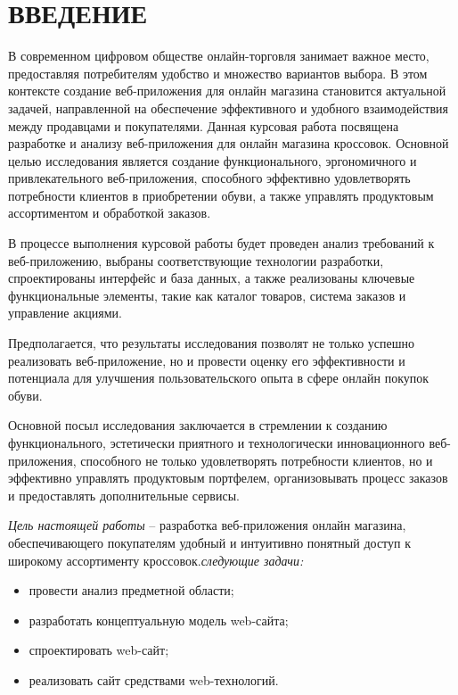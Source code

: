 \section*{ВВЕДЕНИЕ}

В современном цифровом обществе онлайн-торговля занимает важное место, предоставляя потребителям удобство и множество вариантов выбора. В этом контексте создание веб-приложения для онлайн магазина становится актуальной задачей, направленной на обеспечение эффективного и удобного взаимодействия между продавцами и покупателями. Данная курсовая работа посвящена разработке и анализу веб-приложения для онлайн магазина кроссовок. Основной целью исследования является создание функционального, эргономичного и привлекательного веб-приложения, способного эффективно удовлетворять потребности клиентов в приобретении обуви, а также управлять продуктовым ассортиментом и обработкой заказов.

В процессе выполнения курсовой работы будет проведен анализ требований к веб-приложению, выбраны соответствующие технологии разработки, спроектированы интерфейс и база данных, а также реализованы ключевые функциональные элементы, такие как каталог товаров, система заказов и управление акциями. 

Предполагается, что результаты исследования позволят не только успешно реализовать веб-приложение, но и провести оценку его эффективности и потенциала для улучшения пользовательского опыта в сфере онлайн покупок обуви.

Основной посыл исследования заключается в стремлении к созданию функционального, эстетически приятного и технологически инновационного веб-приложения, способного не только удовлетворять потребности клиентов, но и эффективно управлять продуктовым портфелем, организовывать процесс заказов и предоставлять дополнительные сервисы.

\emph{Цель настоящей работы} – разработка веб-приложения онлайн магазина, обеспечивающего покупателям удобный и интуитивно понятный доступ к широкому ассортименту кроссовок.\emph{следующие задачи:}
\begin{itemize}
\item провести анализ предметной области;
\item разработать концептуальную модель web-сайта;
\item спроектировать web-сайт;
\item реализовать сайт средствами web-технологий.
\end{itemize}

